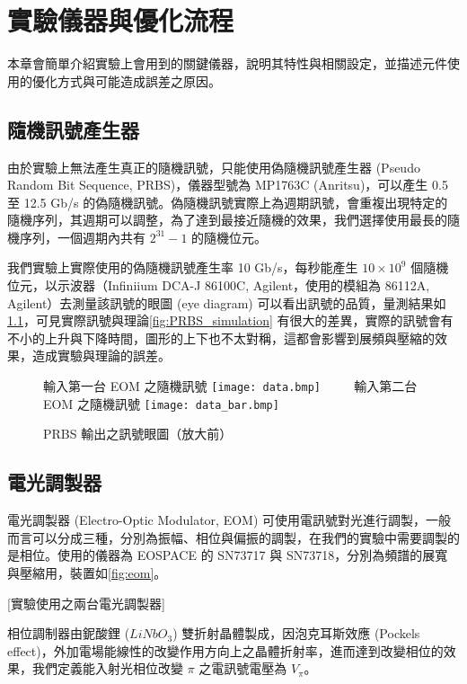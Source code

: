 \documentclass[class=NCU_thesis, crop=false]{standalone}
\begin{document}
\chapter{實驗儀器與優化流程}
本章會簡單介紹實驗上會用到的關鍵儀器，說明其特性與相關設定，並描述元件使用的優化方式與可能造成誤差之原因。

\section{隨機訊號產生器}
由於實驗上無法產生真正的隨機訊號，只能使用偽隨機訊號產生器 (Pseudo Random Bit Sequence, PRBS)，儀器型號為 MP1763C (Anritsu)，可以產生 0.5 至 12.5 Gb/s 的偽隨機訊號。偽隨機訊號實際上為週期訊號，會重複出現特定的隨機序列，其週期可以調整，為了達到最接近隨機的效果，我們選擇使用最長的隨機序列，一個週期內共有 $2^{31}-1$ 的隨機位元。

我們實驗上實際使用的偽隨機訊號產生率 10 Gb/s，每秒能產生 $10\times 10^{9}$ 個隨機位元，以示波器（Infiniium DCA-J 86100C, Agilent，使用的模組為 86112A, Agilent）去測量該訊號的眼圖 (eye diagram) 可以看出訊號的品質，量測結果如\cref{fig:prbs_eye}，可見實際訊號與理論\cref{fig:PRBS_simulation} 有很大的差異，實際的訊號會有不小的上升與下降時間，圖形的上下也不太對稱，這都會影響到展頻與壓縮的效果，造成實驗與理論的誤差。

\begin{figure}[!hbt]
    \centering
    \subcaptionbox
        {輸入第一台 EOM 之隨機訊號
        \label{fig:subfig_fig1}}
        {\texttt{[image: data.bmp]}}
    ~~~~
    \subcaptionbox
        {輸入第二台 EOM 之隨機訊號
        \label{fig:subfig_fig2}}
        {\texttt{[image: data\_bar.bmp]}}
    \caption{PRBS 輸出之訊號眼圖（放大前）}
    \label{fig:prbs_eye}
\end{figure}

\section{電光調製器}

電光調製器 (Electro-Optic Modulator, EOM) 可使用電訊號對光進行調製，一般而言可以分成三種，分別為振幅、相位與偏振的調製，在我們的實驗中需要調製的是相位。使用的儀器為 EOSPACE 的 SN73717 與 SN73718，分別為頻譜的展寬與壓縮用，裝置如\cref{fig:eom}。

[實驗使用之兩台電光調製器]

相位調制器由鈮酸鋰 ($LiNbO_{3}$) 雙折射晶體製成，因泡克耳斯效應 (Pockels effect)，外加電場能線性的改變作用方向上之晶體折射率，進而達到改變相位的效果，我們定義能入射光相位改變 $\pi$ 之電訊號電壓為 $V_{\pi}$。
\end{document}

